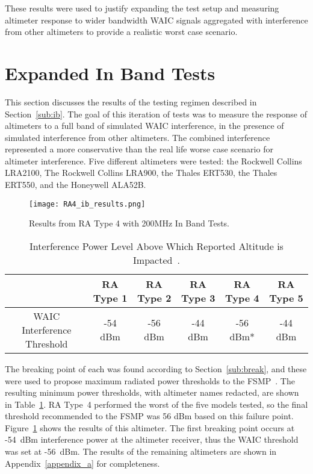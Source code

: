 These results were used to justify expanding the test setup and measuring altimeter response to wider bandwidth WAIC signals aggregated with interference from other altimeters to provide a realistic worst case scenario.

\section{Expanded In Band Tests}\label{sec:dvsg_ib_results}
This section discusses the results of the testing regimen described in Section~\ref{sub:ib}. The goal of this iteration of tests was to measure the response of altimeters to a full band of simulated WAIC interference, in the presence of simulated interference from other altimeters. The combined interference represented a more conservative than the real life worse case scenario for altimeter interference. Five different altimeters were tested: the Rockwell Collins LRA2100, The Rockwell Collins LRA900, the Thales ERT530, the Thales ERT550, and the Honeywell ALA52B.
 \begin{figure}[h!]
	\centering
	\texttt{[image: RA4\_ib\_results.png]}
	\caption{Results from RA Type 4 with 200MHz In Band Tests.}
	\label{fig:RA4}
\end{figure}

\begin{table}[]
\begin{tabular}{@{}cccccc@{}}
\toprule
                            & RA Type 1 & RA Type 2 & RA Type 3 & RA Type 4 & RA Type 5 \\ \midrule
WAIC Interference Threshold & -54 dBm   & -56 dBm   & -44 dBm   & -56 dBm*  & -44 dBm   \\ \bottomrule
\end{tabular}
\caption{Interference Power Level Above Which Reported Altitude is Impacted~\cite{uwe_radio_2019}.}
\label{tab:ib_thresholds_fsmp}
\end{table}

The breaking point of each was found according to Section~\ref{sub:break}, and these were used to propose maximum radiated power thresholds to the FSMP~\cite{uwe_radio_2019}. The resulting minimum power thresholds, with altimeter names redacted, are shown in Table~\ref{tab:ib_thresholds_fsmp}. RA Type~4 performed the worst of the five models tested, so the final threshold recommended to the FSMP was 56 dBm based on this failure point. Figure~\ref{fig:RA4} 
 shows the results of this altimeter. The first breaking point occurs at -54~dBm interference power at the altimeter receiver, thus the WAIC threshold was set at -56~dBm. The results of the remaining altimeters are shown in Appendix~\ref{appendix_a} for completeness. 

